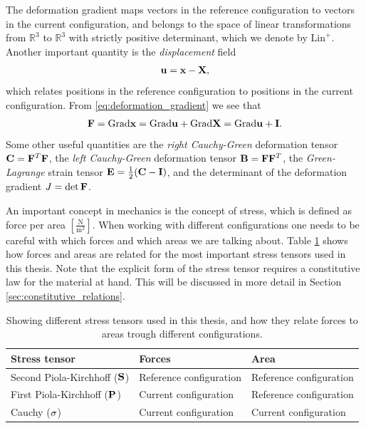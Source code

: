 The deformation gradient maps vectors in the reference configuration to
vectors in the current configuration, and belongs to the space of
linear transformations from $\mathbb{R}^3$ to $\mathbb{R}^3$ with
strictly positive determinant, which we denote by
$\mathrm{Lin}^+$. Another important quantity is the
\emph{displacement} field  
\begin{align}
  \mathbf{u} = \mathbf{x}-\mathbf{X}, 
  \label{eq:displacement}
\end{align}
which relates positions in the reference configuration to positions
in the current configuration. From \eqref{eq:deformation_gradient} we
see that
\begin{align}
  \mathbf{F} = \mathrm{Grad} \mathbf{x} = \mathrm{Grad} \mathbf{u} + \mathrm{Grad} \mathbf{X} = \mathrm{Grad} \mathbf{u} + \mathbf{I}.
\end{align}
Some other useful quantities are the \emph{right Cauchy-Green} deformation
tensor $\mathbf{C} = \mathbf{F}^T\mathbf{F}$, the \emph{left Cauchy-Green} deformation tensor
$\mathbf{B} = \mathbf{F}\mathbf{F}^T$, the \emph{Green-Lagrange} strain tensor
$\mathbf{E} = \frac{1}{2}(\mathbf{C} - \mathbf{I})$, and the determinant of the
deformation gradient $J = \det \mathbf{F}$.

An important concept in mechanics is the concept of stress, which is
defined as force per area
$\left[\frac{\mathrm{N}}{\mathrm{m}^2}\right]$. When working with
different configurations one needs to be careful with which forces and
which areas we are talking about. Table \ref{tab:stress_tensor}
shows how forces and areas are related for the most important stress
tensors used in this thesis. Note that the explicit form of the stress
tensor requires a constitutive law for the material at hand. This will
be discussed in more detail in Section \ref{sec:constitutive_relations}.

\begin{table}[h]
  \centering
  \begin{tabular}{lll}
    \toprule
    Stress tensor & Forces & Area \\
    \midrule
    Second Piola-Kirchhoff ($\mathbf{S}$) & Reference configuration & Reference configuration \\
    First Piola-Kirchhoff ($\mathbf{P}$) & Current configuration  &  Reference configuration \\
    Cauchy ($\mathbf{\sigma}$) &  Current configuration & Current configuration  \\
    \bottomrule
  \end{tabular}
  \caption{\label{tab:stress_tensor}Showing different stress tensors
    used in this thesis, and how
    they relate forces to areas trough different configurations.}
\end{table}


